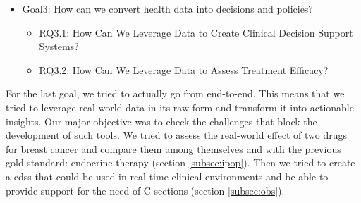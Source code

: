 \begin{itemize}
    \item Goal3: How can we convert health data into decisions and policies?
    \begin{itemize}
        \item RQ3.1: How Can We Leverage Data to Create Clinical Decision Support Systems?
        \item RQ3.2: How Can We Leverage Data to Assess Treatment Efficacy?
    \end{itemize}    
\end{itemize}

For the last goal, we tried to actually go from end-to-end. This means that we tried to leverage real world data in its raw form and transform it into actionable insights. Our major objective was to check the challenges that block the development of such tools. We tried to assess the real-world effect of two drugs for breast cancer and compare them among themselves and with the previous gold standard: endocrine therapy (section \ref{subsec:ipop}). Then we tried to create a \ac{cdss} that could be used in real-time clinical environments and be able to provide support for the need of C-sections (section \ref{subsec:obs}). 